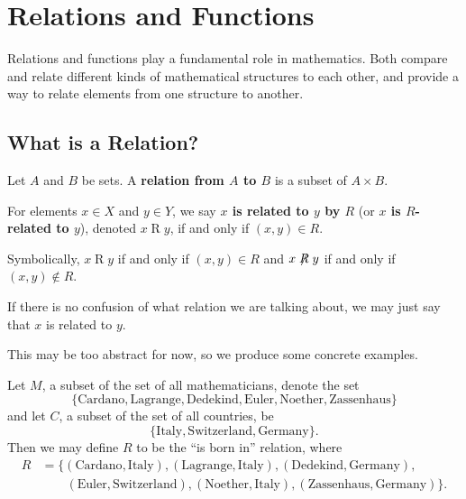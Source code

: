 \chapter{Relations and Functions}
Relations and functions play a fundamental role in mathematics. Both compare and relate different kinds of mathematical structures to each other, and provide a way to relate elements from one structure to another.

\section{What is a Relation?}
\begin{definition}
    Let $A$ and $B$ be sets. A \textbf{relation from $A$ to $B$} is a subset of $A \times B$.

    For elements $x \in X$ and $y \in Y$, we say \textbf{$x$ is related to $y$ by $R$} (or \textbf{$x$ is $R$-related to $y$}), denoted $x\mathrel{R}y$, if and only if $(x,y) \in R$.
\end{definition}
\begin{remark}
    Symbolically, $x\mathrel{R}y$ if and only if $(x,y)\in R$ and $x\not\mathrel{R}y$ if and only if $(x,y) \notin R$.
\end{remark}
\begin{remark}
    If there is no confusion of what relation we are talking about, we may just say that $x$ is related to $y$.
\end{remark}

This may be too abstract for now, so we produce some concrete examples.
\begin{example}
    Let $M$, a subset of the set of all mathematicians, denote the set
    \[
        \{\text{Cardano}, \text{Lagrange}, \text{Dedekind}, \text{Euler}, \text{Noether}, \text{Zassenhaus}\}
    \]
    and let $C$, a subset of the set of all countries, be
    \[
        \{\text{Italy}, \text{Switzerland}, \text{Germany}\}.
    \]
    Then we may define $R$ to be the ``is born in'' relation, where
    \begin{align*}
        R &= \{(\text{Cardano}, \text{Italy}),(\text{Lagrange}, \text{Italy}),(\text{Dedekind}, \text{Germany}),\\
        &\quad\quad(\text{Euler}, \text{Switzerland}),(\text{Noether}, \text{Italy}),(\text{Zassenhaus}, \text{Germany})\}.
    \end{align*}
\end{example}

